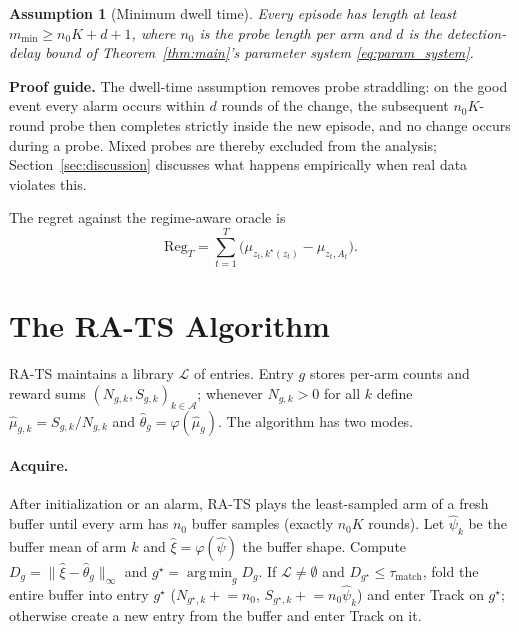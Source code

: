 \documentclass[11pt]{article}
\newtheorem{assumption}{Assumption}
\newcommand{\Acal}{\mathcal A}
\newcommand{\Lcal}{\mathcal L}
\newcommand{\Reg}{\mathrm{Reg}}
\newcommand{\argmin}{\operatorname*{arg\,min}}
\newcommand{\phic}{\varphi}
\newcommand{\taum}{\tau_{\mathrm{match}}}
\newcommand{\proofguide}[1]{\par\smallskip\noindent\textcolor{blue!65!black}{\textbf{Proof guide.} #1}\par\smallskip}
\begin{document}
\begin{assumption}[Minimum dwell time]
\label{ass:dwell_time}
Every episode has length at least $m_{\min}\ge n_0K+d+1$, where $n_0$ is the probe length per arm and $d$ is the detection-delay bound of Theorem~\ref{thm:main}'s parameter system \eqref{eq:param_system}.
\end{assumption}

\proofguide{The dwell-time assumption removes probe straddling: on the good event every alarm occurs within $d$ rounds of the change, the subsequent $n_0K$-round probe then completes strictly inside the new episode, and no change occurs during a probe. Mixed probes are thereby excluded from the analysis; Section~\ref{sec:discussion} discusses what happens empirically when real data violates this.}

The regret against the regime-aware oracle is
\begin{equation}
    \Reg_T=\sum_{t=1}^T\bigl(\mu_{z_t,k^\star(z_t)}-\mu_{z_t,A_t}\bigr).
\end{equation}

\section{The RA-TS Algorithm}
\label{sec:algorithm}

RA-TS maintains a library $\Lcal$ of entries. Entry $g$ stores per-arm counts and reward sums $(N_{g,k},S_{g,k})_{k\in\Acal}$; whenever $N_{g,k}>0$ for all $k$ define $\widehat\mu_{g,k}=S_{g,k}/N_{g,k}$ and $\widehat\theta_g=\phic(\widehat\mu_g)$. The algorithm has two modes.

\paragraph{Acquire.}
After initialization or an alarm, RA-TS plays the least-sampled arm of a fresh buffer until every arm has $n_0$ buffer samples (exactly $n_0K$ rounds). Let $\widehat\psi_k$ be the buffer mean of arm $k$ and $\widehat\xi=\phic(\widehat\psi)$ the buffer shape. Compute $D_g=\|\widehat\xi-\widehat\theta_g\|_\infty$ and $g^\star=\argmin_g D_g$. If $\Lcal\ne\emptyset$ and $D_{g^\star}\le\taum$, fold the entire buffer into entry $g^\star$ ($N_{g^\star,k}\mathrel{+}=n_0$, $S_{g^\star,k}\mathrel{+}=n_0\widehat\psi_k$) and enter Track on $g^\star$; otherwise create a new entry from the buffer and enter Track on it.
\end{document}
